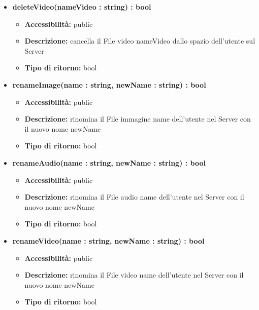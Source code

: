 {\begin{itemize}
\begin{itemize}
				\item \textbf{Tipo di ritorno:} bool
				\end{itemize}
			\item \textbf{deleteVideo(nameVideo : string) : bool}
				\begin{itemize}
				\item \textbf{Accessibilit\`{a}:} public
				\item \textbf{Descrizione:} cancella il File video nameVideo dallo spazio dell'utente sul Server
				\item \textbf{Tipo di ritorno:} bool
				\end{itemize}
			\item \textbf{renameImage(name : string, newName : string) : bool}
				\begin{itemize}
				\item \textbf{Accessibilit\`{a}:} public
				\item \textbf{Descrizione:} rinomina  il File immagine name dell'utente nel Server con  il nuovo nome newName
				\item \textbf{Tipo di ritorno:} bool
				\end{itemize}
			\item \textbf{renameAudio(name : string, newName : string) : bool}
				\begin{itemize}
				\item \textbf{Accessibilit\`{a}:} public
				\item \textbf{Descrizione:} rinomina  il File audio name dell'utente nel Server con  il nuovo nome newName
				\item \textbf{Tipo di ritorno:} bool
				\end{itemize}
			\item \textbf{renameVideo(name : string, newName : string) : bool}
				\begin{itemize}
				\item \textbf{Accessibilit\`{a}:} public
				\item \textbf{Descrizione:} rinomina  il File video name dell'utente nel Server con  il nuovo nome newName
				\item \textbf{Tipo di ritorno:} bool
				\end{itemize}

			\end{itemize}
	}
	
	
	
	
	
	
	
	
	
	
